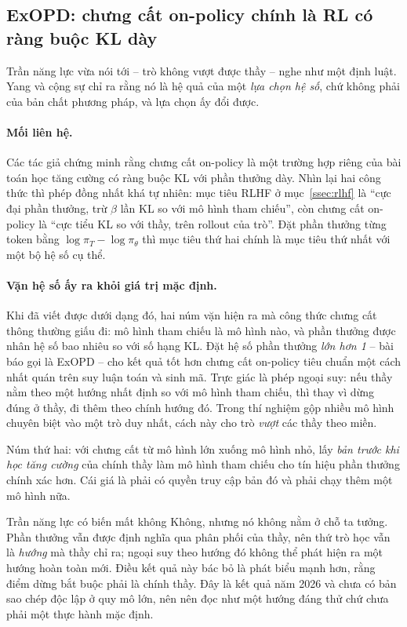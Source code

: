 \subsection{ExOPD: chưng cất on-policy chính là RL có ràng buộc KL dày}
\label{ssec:exopd}

Trần năng lực vừa nói tới -- trò không vượt được thầy -- nghe như một định luật. Yang và cộng sự \cite{yang2026exopd} chỉ ra rằng nó là hệ quả của một \emph{lựa chọn hệ số}, chứ không phải của bản chất phương pháp, và lựa chọn ấy đổi được.

\paragraph{Mối liên hệ.} Các tác giả chứng minh rằng chưng cất on-policy là một trường hợp riêng của bài toán học tăng cường có ràng buộc KL với phần thưởng dày. Nhìn lại hai công thức thì phép đồng nhất khá tự nhiên: mục tiêu RLHF ở mục~\ref{ssec:rlhf} là ``cực đại phần thưởng, trừ $\beta$ lần KL so với mô hình tham chiếu'', còn chưng cất on-policy là ``cực tiểu KL so với thầy, trên rollout của trò''. Đặt phần thưởng từng token bằng $\log \pi_T - \log \pi_\theta$ thì mục tiêu thứ hai chính là mục tiêu thứ nhất với một bộ hệ số cụ thể.

\paragraph{Vặn hệ số ấy ra khỏi giá trị mặc định.} Khi đã viết được dưới dạng đó, hai núm vặn hiện ra mà công thức chưng cất thông thường giấu đi: mô hình tham chiếu là mô hình nào, và phần thưởng được nhân hệ số bao nhiêu so với số hạng KL. Đặt hệ số phần thưởng \emph{lớn hơn 1} -- bài báo gọi là ExOPD -- cho kết quả tốt hơn chưng cất on-policy tiêu chuẩn một cách nhất quán trên suy luận toán và sinh mã. Trực giác là phép ngoại suy: nếu thầy nằm theo một hướng nhất định so với mô hình tham chiếu, thì thay vì dừng đúng ở thầy, đi thêm theo chính hướng đó. Trong thí nghiệm gộp nhiều mô hình chuyên biệt vào một trò duy nhất, cách này cho trò \emph{vượt} các thầy theo miền.

Núm thứ hai: với chưng cất từ mô hình lớn xuống mô hình nhỏ, lấy \emph{bản trước khi học tăng cường} của chính thầy làm mô hình tham chiếu cho tín hiệu phần thưởng chính xác hơn. Cái giá là phải có quyền truy cập bản đó và phải chạy thêm một mô hình nữa.

\begin{assess}{Trần năng lực có biến mất không}
Không, nhưng nó không nằm ở chỗ ta tưởng. Phần thưởng vẫn được định nghĩa qua phân phối của thầy, nên thứ trò học vẫn là \emph{hướng} mà thầy chỉ ra; ngoại suy theo hướng đó không thể phát hiện ra một hướng hoàn toàn mới. Điều kết quả này bác bỏ là phát biểu mạnh hơn, rằng điểm dừng bắt buộc phải là chính thầy. Đây là kết quả năm 2026 và chưa có bản sao chép độc lập ở quy mô lớn, nên nên đọc như một hướng đáng thử chứ chưa phải một thực hành mặc định.
\end{assess}

